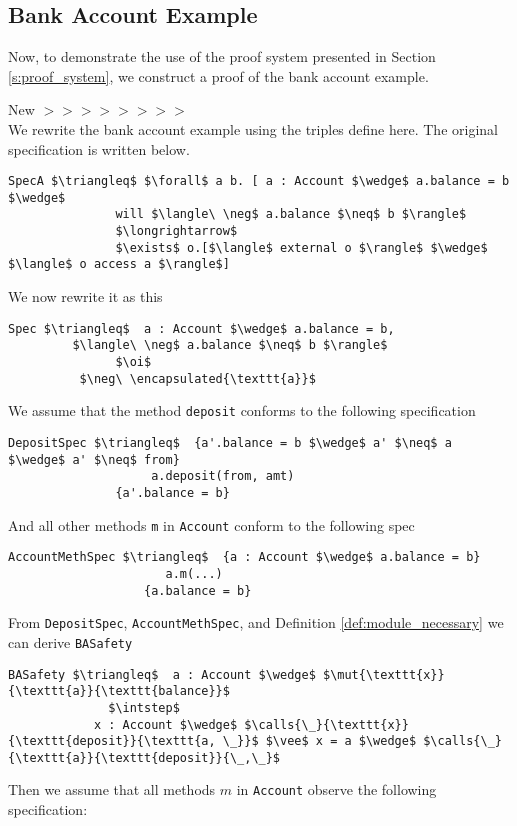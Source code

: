\documentclass[12pt]{article}
\newcommand\trans{\mathlarger{\mathlarger \leadsto}}
\newcommand\intstep{\hspace{1.5mm}{\raisebox{3pt}{$\bullet$}}\hspace{-1.5mm}{\hookrightarrow}}
\newcommand\oi{\hspace{1mm}{\raisebox{1pt}{$\bullet$}}\hspace{-1mm}{\trans}}
\newcommand\mut[3]{\langle #1\ \texttt{mut}\ #2.#3 \rangle}
\newcommand\encapsulated[1]{\langle \texttt{encapsulated}\ #1 \rangle}
\newcommand\calls[4]{\langle #1\ \texttt{calls}\ #2.#3(#4) \rangle}
\numberwithin{case}{lemma}
\numberwithin{case}{theorem}
\numberwithin{subcase}{case}
\begin{document}
\subsection{Bank Account Example}

Now, to demonstrate the use of the proof system presented in Section \ref{s:proof_system}, we construct 
a proof of the bank account example. 

{\color{Green}New $>>>>>>>>$}\\
We rewrite the bank account example using the triples define here.
The original specification is written below.
\begin{lstlisting}[mathescape=true]
SpecA $\triangleq$ $\forall$ a b. [ a : Account $\wedge$ a.balance = b $\wedge$
               will $\langle\ \neg$ a.balance $\neq$ b $\rangle$
               $\longrightarrow$
               $\exists$ o.[$\langle$ external o $\rangle$ $\wedge$ $\langle$ o access a $\rangle$]
\end{lstlisting}
We now rewrite it as this
\begin{lstlisting}[mathescape=true]
Spec $\triangleq$  a : Account $\wedge$ a.balance = b,
         $\langle\ \neg$ a.balance $\neq$ b $\rangle$
               $\oi$
          $\neg\ \encapsulated{\texttt{a}}$
\end{lstlisting}
We assume that the method \texttt{deposit} conforms to the following 
specification
\begin{lstlisting}[mathescape=true]
DepositSpec $\triangleq$  {a'.balance = b $\wedge$ a' $\neq$ a $\wedge$ a' $\neq$ from}
					a.deposit(from, amt) 
			   {a'.balance = b}
\end{lstlisting}
And all other methods \texttt{m} in \texttt{Account} conform to the 
following spec
\begin{lstlisting}[mathescape=true]
AccountMethSpec $\triangleq$  {a : Account $\wedge$ a.balance = b}
					  a.m(...) 
			       {a.balance = b}
\end{lstlisting}
From \texttt{DepositSpec}, \texttt{AccountMethSpec}, and Definition \ref{def:module_necessary} we can derive \texttt{BASafety}
\begin{lstlisting}[mathescape=true]
BASafety $\triangleq$  a : Account $\wedge$ $\mut{\texttt{x}}{\texttt{a}}{\texttt{balance}}$
              $\intstep$
            x : Account $\wedge$ $\calls{\_}{\texttt{x}}{\texttt{deposit}}{\texttt{a, \_}}$ $\vee$ x = a $\wedge$ $\calls{\_}{\texttt{a}}{\texttt{deposit}}{\_,\_}$
\end{lstlisting}
Then we assume that all methods $m$ in \texttt{Account} observe the following specification:
\end{document}
